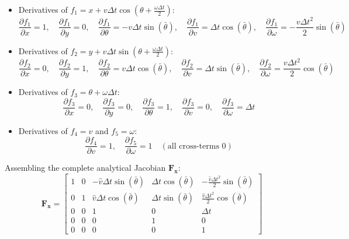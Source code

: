 \documentclass[11pt, a4paper]{article}
\begin{document}
\begin{itemize}
    \item Derivatives of $f_1 = x + v \Delta t \cos(\theta + \frac{\omega \Delta t}{2})$:
    \begin{equation}
        \frac{\partial f_1}{\partial x} = 1, \quad \frac{\partial f_1}{\partial y} = 0, \quad \frac{\partial f_1}{\partial \theta} = -v \Delta t \sin(\bar{\theta}), \quad \frac{\partial f_1}{\partial v} = \Delta t \cos(\bar{\theta}), \quad \frac{\partial f_1}{\partial \omega} = -\frac{v \Delta t^2}{2} \sin(\bar{\theta})
    \end{equation}
    \item Derivatives of $f_2 = y + v \Delta t \sin(\theta + \frac{\omega \Delta t}{2})$:
    \begin{equation}
        \frac{\partial f_2}{\partial x} = 0, \quad \frac{\partial f_2}{\partial y} = 1, \quad \frac{\partial f_2}{\partial \theta} = v \Delta t \cos(\bar{\theta}), \quad \frac{\partial f_2}{\partial v} = \Delta t \sin(\bar{\theta}), \quad \frac{\partial f_2}{\partial \omega} = \frac{v \Delta t^2}{2} \cos(\bar{\theta})
    \end{equation}
    \item Derivatives of $f_3 = \theta + \omega \Delta t$:
    \begin{equation}
        \frac{\partial f_3}{\partial x} = 0, \quad \frac{\partial f_3}{\partial y} = 0, \quad \frac{\partial f_3}{\partial \theta} = 1, \quad \frac{\partial f_3}{\partial v} = 0, \quad \frac{\partial f_3}{\partial \omega} = \Delta t
    \end{equation}
    \item Derivatives of $f_4 = v$ and $f_5 = \omega$:
    \begin{equation}
        \frac{\partial f_4}{\partial v} = 1, \quad \frac{\partial f_5}{\partial \omega} = 1 \quad (\text{all cross-terms } 0)
    \end{equation}
\end{itemize}

Assembling the complete analytical Jacobian $\mathbf{F}_{\mathbf{x}}$:
\begin{equation}
    \mathbf{F}_{\mathbf{x}} = 
    \begin{bmatrix}
        1 & 0 & -\hat{v}\Delta t \sin(\bar{\theta}) & \Delta t \cos(\bar{\theta}) & -\frac{\hat{v}\Delta t^2}{2}\sin(\bar{\theta}) \\
        0 & 1 & \hat{v}\Delta t \cos(\bar{\theta}) & \Delta t \sin(\bar{\theta}) & \frac{\hat{v}\Delta t^2}{2}\cos(\bar{\theta}) \\
        0 & 0 & 1 & 0 & \Delta t \\
        0 & 0 & 0 & 1 & 0 \\
        0 & 0 & 0 & 0 & 1
    \end{bmatrix}
\end{equation}
\end{document}
